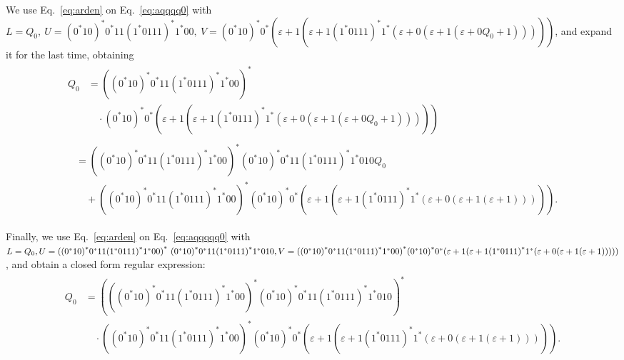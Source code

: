 \documentclass[12pt]{article}
\newcommand{\e}{\varepsilon}
\begin{document}
We use Eq.~\ref{eq:arden} on Eq.~\ref{eq:aqqqq0} with $L = Q_0,\
U = {(0^*10)}^*0^*{11(1^*0111)}^*1^*00,\
V = {(0^*10)}^*0^*(\e + 1(\e + {1(1^*0111)}^*1^*(\e + 0(\e + 1(\e + 0Q_0 +
1)))))$, and expand it for the last time, obtaining
\begin{align}
  \begin{split}
    Q_0 &= {({(0^*10)}^*0^*{11(1^*0111)}^*1^*00)}^* \\
        & \quad \cdot {(0^*10)}^*0^*(\e + 1(\e + {1(1^*0111)}^*1^*(\e
          + 0(\e + 1(\e + 0Q_0 + 1)))))
  \end{split} \\
  \begin{split} \label{eq:aqqqqq0}
    &= {({(0^*10)}^*0^*{11(1^*0111)}^*1^*00)}^*
      {(0^*10)}^*0^*{11(1^*0111)}^*1^*010Q_0 \\
    & \quad + {({(0^*10)}^*0^*{11(1^*0111)}^*1^*00)}^*{(0^*10)}^*0^*(\e + 1(\e
      + {1(1^*0111)}^*1^*(\e + 0(\e + 1(\e + 1))))).
  \end{split}
\end{align}

Finally, we use Eq.~\ref{eq:arden} on Eq.~\ref{eq:aqqqqq0} with $L = Q_0,\ \\
U = {({(0^*10)}^*0^*{11(1^*0111)}^*1^*00)}^*\
{(0^*10)}^*0^*{11(1^*0111)}^*1^*010,\ \\
V = {({(0^*10)}^*0^*{11(1^*0111)}^*1^*00)}^*{(0^*10)}^*0^*(\e + 1(\e
+ {1(1^*0111)}^*1^*(\e + 0(\e + 1(\e + 1)))))$, and obtain a closed form regular
expression:
\begin{align}
  \begin{split}
    Q_0 &= {({({(0^*10)}^*0^*{11(1^*0111)}^*1^*00)}^*
      {(0^*10)}^*0^*{11(1^*0111)}^*1^*010)}^*
    \\  & \quad \cdot {({(0^*10)}^*0^*{11(1^*0111)}^*1^*00)}^*{(0^*10)}^*0^*
      (\e + 1(\e + {1(1^*0111)}^*1^*(\e + 0(\e + 1(\e + 1))))).
  \end{split}
\end{align}


{\footnotesize
}
\end{document}
